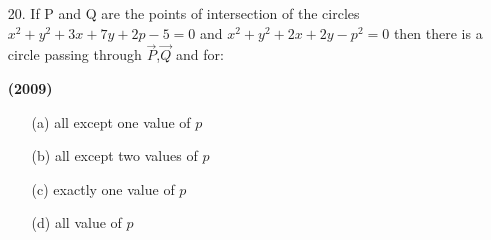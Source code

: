 \documentclass[journal,12pt,twocolumn]{IEEEtran}
\theoremstyle{remark}
\begin{document}
\begin{enumerate}
\item[20.]If P and Q are the points of intersection of the circles $x^2+y^2+3x+7y+2p-5=0$ and $x^2+y^2+2x+2y-p^2=0$ then there is a circle passing through $\vec{P}$,$\vec{Q}$ and  for:

\hfill{\textbf{(2009)}}

\begin{enumerate}
\item[(a)] all except one value of $p$
\item[(b)] all except two values of $p$
\item[(c)] exactly one value of $p$
\item[(d)] all value of $p$
\end{enumerate}
\end{enumerate}
\end{document}
